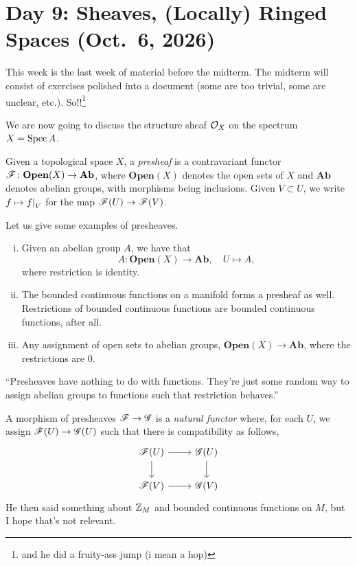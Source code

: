 \section{Day 9: Sheaves, (Locally) Ringed Spaces (Oct.\ 6, 2026)}
This week is the last week of material before the midterm. The midterm will consist of exercises polished into a document (some are too trivial, some are unclear, etc.). So!!\footnote{and he did a fruity-ass jump (i mean a hop)}

We are now going to discuss the structure sheaf $\mathcal O_X$ on the spectrum $X = \operatorname{Spec} A$.
\begin{definition} \label{defn:presheaf}
    Given a topological space $X$, a \textit{presheaf} is a contravariant functor $\mathscr F \colon \mathbf{Open}(X) \to \mathbf{Ab}$, where $\mathbf{Open}(X)$ denotes the open sets of $X$ and $\mathbf{Ab}$ denotes abelian groups, with morphisms being inclusions. Given $V \subset U$, we write $f \mapsto \restr{f}{V}$ for the map $\mathscr F(U) \to \mathscr F(V)$.
\end{definition}

Let us give some examples of presheaves.
\begin{enumerate}[(i)]
    \item Given an abelian group $A$, we have that
    \[ A \colon \mathbf{Open}(X) \to \mathbf{Ab}, \quad U \mapsto A, \]
    where restriction is identity.
    \item The bounded continuous functions on a manifold forms a presheaf as well. Restrictions of bounded continuous functions are bounded continuous functions, after all.
    \item Any assignment of open sets to abelian groups, $\mathbf{Open}(X) \to \mathbf{Ab}$, where the restrictions are $0$.
\end{enumerate}

``Presheaves have nothing to do with functions. They're just some random way to assign abelian groups to functions such that restriction behaves.''

A morphism of presheaves $\mathscr F \to \mathscr G$ is a \textit{natural functor} where, for each $U$, we assign $\mathscr F(U) \to \mathscr G(U)$ such that there is compatibility as follows,
\[
    \begin{tikzcd}
        \SCF(U) \arrow[r] \arrow[d] & \SCG(U) \arrow[d] \\
        \SCF(V) \arrow[r] & \SCG(V)
    \end{tikzcd}
\]
He then said something about $\mathbb Z_M$ and bounded continuous functions on $M$, but I hope that's not relevant.


